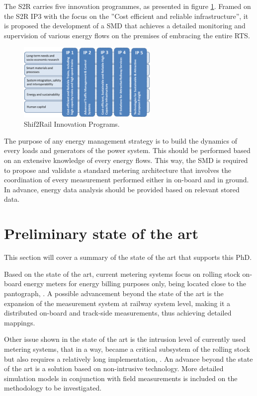 The \ac{S2R} carries five innovation programmes, as presented in figure \ref{fig:ips}. Framed on the S2R \ac{IP3} with the focus on the ”Cost efficient and reliable infrastructure”, it is proposed the development of a \ac{SMD} that achieves a detailed monitoring and supervision of various energy flows on the premises of embracing the entire \ac{RTS}.

\begin{figure}[h!]
	\centering
	\includegraphics[width=0.60\textwidth,keepaspectratio]{figures/1.Intro/IPs}
	\caption{Shif2Rail Innovation Programs. }
	\label{fig:ips}
\end{figure}

The purpose of any energy management strategy is to build the dynamics of every loads and generators of the power system. 
This should be performed based on an extensive knowledge of every energy flows. 
This way, the \ac{SMD} is required to propose and validate a standard metering architecture that involves the coordination of every measurement performed either in on-board and in ground. 
In advance, energy data analysis should be provided based on relevant stored data. 

\section{Preliminary state of the art}

This section will cover a summary of the state of the art that supports this PhD.

Based on the state of the art, current metering systems focus on rolling stock on-board energy meters for energy billing purposes only, being located close to the pantograph, \cite{shift2rail2015}.
A possible advancement beyond the state of the art is the expansion of the measurement system at railway system level, making it a distributed on-board and track-side measurements, thus achieving detailed mappings. 


Other issue shown in the state of the art is the intrusion level of currently used metering systems, that in a way, became a critical subsystem of the rolling stock but also requires a relatively long implementation, \cite{shift2rail2015}. 
An advance beyond the state of the art is a solution based on non-intrusive technology. More detailed simulation models in conjunction with field measurements is included on the methodology to be investigated.



